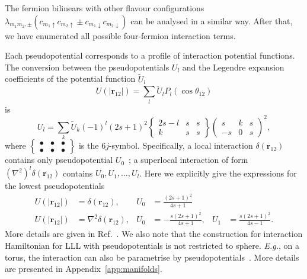 \documentclass{timesjhep}
\begin{document}
The fermion bilinears with other flavour configurations $\lambda_{m_1m_2,\pm}(c_{m_1\uparrow}c_{m_2\uparrow}\pm c_{m_1\downarrow}c_{m_2\downarrow})$ can be analysed in a similar way. After that, we have enumerated all possible four-fermion interaction terms.

Each pseudopotential corresponds to a profile of interaction potential functions. The conversion between the pseudopotentials $U_l$ and the Legendre expansion coefficients of the potential function $\tilde{U}_l$
\begin{equation}
    U(|\mathbf{r}_{12}|)=\sum_l\tilde{U}_lP_l(\cos\theta_{12})
\end{equation}
is
\begin{equation}
    U_l=\sum_k \tilde{U}_k(-1)^l(2s+1)^2\begin{Bmatrix}2s-l&s&s\\k&s&s\end{Bmatrix}\begin{pmatrix}s&k&s\\-s&0&s\end{pmatrix}^2,
\end{equation}
where $\left\{\begin{smallmatrix}\bullet&\bullet&\bullet\\\bullet&\bullet&\bullet\end{smallmatrix}\right\}$ is the $6j$-symbol. Specifically, a local interaction $\delta(\mathbf{r}_{12})$ contains only pseudopotential $U_0$~; a superlocal interaction of form $(\nabla^2)^l\delta(\mathbf{r}_{12})$ contains $U_0,U_1,\dots,U_l$. Here we explicitly give the expressions for the lowest pseudopotentials
\begin{align}
    U(|\mathbf{r}_{12}|)&=\delta(\mathbf{r}_{12}),&U_0&=\frac{(2s+1)^2}{4s+1}\nonumber\\
    U(|\mathbf{r}_{12}|)&=\nabla^2\delta(\mathbf{r}_{12}),&U_0&=-\frac{s(2s+1)^2}{4s+1},&U_1&=\frac{s(2s+1)^2}{4s-1}.
\end{align}
More details are given in Ref.~\cite{Fan2024}. We also note that the construction for interaction Hamiltonian for LLL with pseudopotentials is not restricted to sphere. \textit{E.g.}, on a torus, the interaction can also be parametrise by pseudopotentials~\cite{Yoshioka1983Torus,Haldane1985Torus,Haldane1987Torus}. More details are presented in Appendix~\ref{app:manifolds}.
\end{document}
